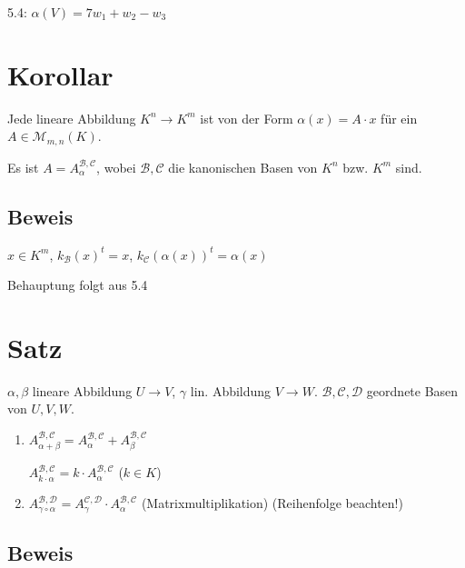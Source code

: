 \documentclass[a4paper, openany]{book}
\begin{document}
        \par \medskip

        5.4: $\alpha(V) = 7w_1 + w_2 - w_3$

        \section{Korollar}

        Jede lineare Abbildung $K^n \rightarrow K^m$ ist von der Form $\alpha(x) = A \cdot x$ für ein $A \in \mathcal{M}_{m,n} (K)$.

        Es ist $A = A_{\alpha}^{\mathcal{B, C}}$, wobei $\mathcal{B, C}$ die kanonischen Basen von $K^n$ bzw. $K^m$ sind.

        \subsection{Beweis}

        $x \in K^m$, $k_{\mathcal{B}}(x)^t = x$, $k_{\mathcal{C}}(\alpha(x))^t = \alpha(x)$

        Behauptung folgt aus 5.4

        \section{Satz}

        $\alpha, \beta$ lineare Abbildung $U \rightarrow V$, $\gamma$ lin. Abbildung $V \rightarrow W$. $\mathcal{B,C,D}$ geordnete Basen von $U,V,W$.

        \begin{enumerate}[label=(\alph*)]
          \item $A_{\alpha + \beta}^{\mathcal{B,C}} = A_{\alpha}^{\mathcal{B, C}} + A_{\beta}^{\mathcal{B,C}}$

          $A_{k \cdot \alpha}^{\mathcal{B,C}} = k \cdot A_{\alpha}^{\mathcal{B,C}}$ ($k \in K$)

          \item $A_{\gamma \circ \alpha}^{\mathcal{B,D}} = A_{\gamma}^{\mathcal{C,D}} \cdot A_{\alpha}^{\mathcal{B,C}}$ (Matrixmultiplikation) (Reihenfolge beachten!)
        \end{enumerate}

        \subsection{Beweis}
\end{document}
